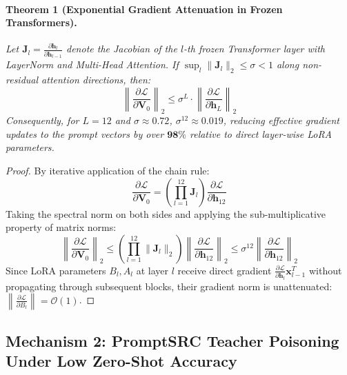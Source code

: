 \documentclass[letterpaper,11pt,leqno]{article}
\begin{document}
\paragraph{Theorem 1 (Exponential Gradient Attenuation in Frozen Transformers).}
\textit{Let $\mathbf{J}_l = \frac{\partial \mathbf{h}_l}{\partial \mathbf{h}_{l-1}}$ denote the Jacobian of the $l$-th frozen Transformer layer with LayerNorm and Multi-Head Attention. If $\sup_l \|\mathbf{J}_l\|_2 \le \sigma < 1$ along non-residual attention directions, then:}
\begin{equation}
    \left\| \frac{\partial \mathcal{L}}{\partial \mathbf{V}_0} \right\|_2 \le \sigma^L \cdot \left\| \frac{\partial \mathcal{L}}{\partial \mathbf{h}_L} \right\|_2
\end{equation}
\textit{Consequently, for $L=12$ and $\sigma \approx 0.72$, $\sigma^{12} \approx 0.019$, reducing effective gradient updates to the prompt vectors by over $\mathbf{98\%}$ relative to direct layer-wise LoRA parameters.}

\begin{proof}
By iterative application of the chain rule:
\begin{equation}
    \frac{\partial \mathcal{L}}{\partial \mathbf{V}_0} = \left( \prod_{l=1}^{12} \mathbf{J}_l \right) \frac{\partial \mathcal{L}}{\partial \mathbf{h}_{12}}
\end{equation}
Taking the spectral norm on both sides and applying the sub-multiplicative property of matrix norms:
\begin{equation}
    \left\| \frac{\partial \mathcal{L}}{\partial \mathbf{V}_0} \right\|_2 \le \left( \prod_{l=1}^{12} \|\mathbf{J}_l\|_2 \right) \left\| \frac{\partial \mathcal{L}}{\partial \mathbf{h}_{12}} \right\|_2 \le \sigma^{12} \left\| \frac{\partial \mathcal{L}}{\partial \mathbf{h}_{12}} \right\|_2
\end{equation}
Since LoRA parameters $B_l, A_l$ at layer $l$ receive direct gradient $\frac{\partial \mathcal{L}}{\partial \mathbf{h}_l} \mathbf{x}_{l-1}^T$ without propagating through subsequent blocks, their gradient norm is unattenuated: $\left\|\frac{\partial \mathcal{L}}{\partial B_l}\right\| = \mathcal{O}(1)$.
\end{proof}

\subsection{Mechanism 2: PromptSRC Teacher Poisoning Under Low Zero-Shot Accuracy}
\end{document}
